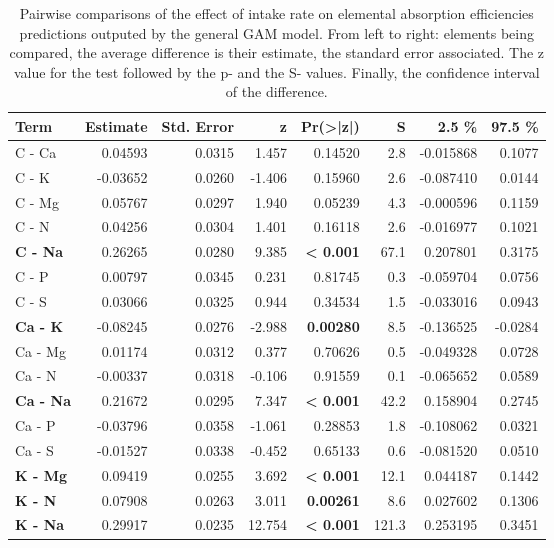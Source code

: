 \begin{table}[H]
\centering
\caption{\label{tab:table_pairs_d_ae}Pairwise comparisons of the effect of intake rate on elemental absorption efficiencies predictions outputed by the general GAM model. From left to right: elements being compared, the average difference is their estimate, the standard error associated. The z value for the test followed by the p- and the S- values. Finally, the confidence interval of the difference.}
\centering
\begin{tabular}[t]{>{}lrrr>{}rrrr}
\toprule
\textbf{Term} & \textbf{Estimate} & \textbf{Std. Error} & \textbf{z} & \textbf{Pr(>|z|)} & \textbf{S} & \textbf{2.5 \%} & \textbf{97.5 \%}\\
\midrule
C - Ca & 0.04593 & 0.0315 & 1.457 & 0.14520 & 2.8 & -0.015868 & 0.1077\\
C - K & -0.03652 & 0.0260 & -1.406 & 0.15960 & 2.6 & -0.087410 & 0.0144\\
C - Mg & 0.05767 & 0.0297 & 1.940 & 0.05239 & 4.3 & -0.000596 & 0.1159\\
C - N & 0.04256 & 0.0304 & 1.401 & 0.16118 & 2.6 & -0.016977 & 0.1021\\
\textbf{C - Na} & 0.26265 & 0.0280 & 9.385 & \textbf{< 0.001} & 67.1 & 0.207801 & 0.3175\\
C - P & 0.00797 & 0.0345 & 0.231 & 0.81745 & 0.3 & -0.059704 & 0.0756\\
C - S & 0.03066 & 0.0325 & 0.944 & 0.34534 & 1.5 & -0.033016 & 0.0943\\
\textbf{Ca - K} & -0.08245 & 0.0276 & -2.988 & \textbf{0.00280} & 8.5 & -0.136525 & -0.0284\\
Ca - Mg & 0.01174 & 0.0312 & 0.377 & 0.70626 & 0.5 & -0.049328 & 0.0728\\
Ca - N & -0.00337 & 0.0318 & -0.106 & 0.91559 & 0.1 & -0.065652 & 0.0589\\
\textbf{Ca - Na} & 0.21672 & 0.0295 & 7.347 & \textbf{< 0.001} & 42.2 & 0.158904 & 0.2745\\
Ca - P & -0.03796 & 0.0358 & -1.061 & 0.28853 & 1.8 & -0.108062 & 0.0321\\
Ca - S & -0.01527 & 0.0338 & -0.452 & 0.65133 & 0.6 & -0.081520 & 0.0510\\
\textbf{K - Mg} & 0.09419 & 0.0255 & 3.692 & \textbf{< 0.001} & 12.1 & 0.044187 & 0.1442\\
\textbf{K - N} & 0.07908 & 0.0263 & 3.011 & \textbf{0.00261} & 8.6 & 0.027602 & 0.1306\\
\textbf{K - Na} & 0.29917 & 0.0235 & 12.754 & \textbf{< 0.001} & 121.3 & 0.253195 & 0.3451\\

\end{tabular}
\end{table}
